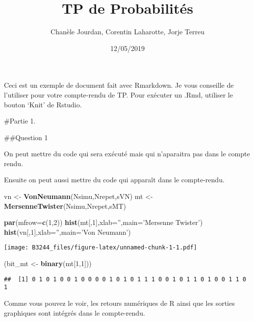 \documentclass[]{article}
\title{TP de Probabilités}
\author{Chanèle Jourdan, Corentin Laharotte, Jorje Terreu}
\date{12/05/2019}
\newenvironment{Shaded}{\begin{snugshade}}{\end{snugshade}}
\newcommand{\DataTypeTok}[1]{\textcolor[rgb]{0.13,0.29,0.53}{#1}}
\newcommand{\DecValTok}[1]{\textcolor[rgb]{0.00,0.00,0.81}{#1}}
\newcommand{\KeywordTok}[1]{\textcolor[rgb]{0.13,0.29,0.53}{\textbf{#1}}}
\newcommand{\NormalTok}[1]{#1}
\newcommand{\StringTok}[1]{\textcolor[rgb]{0.31,0.60,0.02}{#1}}
\begin{document}
\maketitle

Ceci est un exemple de document fait avec Rmarkdown. Je vous conseille
de l'utiliser pour votre compte-rendu de TP. Pour exécuter un .Rmd,
utiliser le bouton `Knit' de Rstudio.

\#Partie 1.

\#\#Question 1

On peut mettre du code qui sera exécuté mais qui n'aparaitra pas dans le
compte rendu.

Ensuite on peut aussi mettre du code qui apparaît dans le compte-rendu.

\begin{Shaded}
\begin{Highlighting}[]
\NormalTok{vn <-}\StringTok{ }\KeywordTok{VonNeumann}\NormalTok{(Nsimu,Nrepet,sVN)}
\NormalTok{mt <-}\StringTok{ }\KeywordTok{MersenneTwister}\NormalTok{(Nsimu,Nrepet,sMT)}

\KeywordTok{par}\NormalTok{(}\DataTypeTok{mfrow=}\KeywordTok{c}\NormalTok{(}\DecValTok{1}\NormalTok{,}\DecValTok{2}\NormalTok{))}
\KeywordTok{hist}\NormalTok{(mt[,}\DecValTok{1}\NormalTok{],}\DataTypeTok{xlab=}\StringTok{''}\NormalTok{,}\DataTypeTok{main=}\StringTok{'Mersenne Twister'}\NormalTok{)}
\KeywordTok{hist}\NormalTok{(vn[,}\DecValTok{1}\NormalTok{],}\DataTypeTok{xlab=}\StringTok{''}\NormalTok{,}\DataTypeTok{main=}\StringTok{'Von Neumann'}\NormalTok{)}
\end{Highlighting}
\end{Shaded}

\texttt{[image: B3244\_files/figure-latex/unnamed-chunk-1-1.pdf]}

\begin{Shaded}
\begin{Highlighting}[]
\NormalTok{(bit_mt <-}\StringTok{ }\KeywordTok{binary}\NormalTok{(mt[}\DecValTok{1}\NormalTok{,}\DecValTok{1}\NormalTok{]))}
\end{Highlighting}
\end{Shaded}

\begin{verbatim}
##  [1] 0 1 0 1 0 0 1 0 0 0 0 1 0 1 0 1 1 1 0 0 1 0 1 1 0 1 0 0 1 1 0 1
\end{verbatim}

Comme vous pouvez le voir, les retours numériques de R ainsi que les
sorties graphiques sont intégrés dans le compte-rendu.
\end{document}
